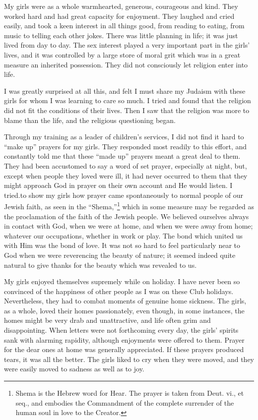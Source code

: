 My girls were as a whole warmhearted, generous,
courageous and kind. They worked hard and had great
capacity for enjoyment. They laughed and cried easily,
and took a keen interest in all things good, from reading
to eating, from music to telling each other jokes.
There was little planning in life; it was just lived from
day to day. The sex interest played a very important
part in the girls’ lives, and it was controlled by a large
store of moral grit which was in a great measure an
inherited possession. They did not consciously let religion
enter into life.

I was greatly surprised at all this, and felt I must
share my Judaism with these girls for whom I was
learning to care so much. I tried and found that the
religion did not fit the conditions of their lives. Then I
saw that the religion was more to blame than the life,
and the religious questioning began.

Through my training as a leader of children’s
services, I did not find it hard to “make up” prayers
for my girls. They responded most readily to this effort,
and constantly told me that these “made up” prayers
meant a great deal to them. They had been accustomed
to say a word of set prayer, especially at night, but,
except when people they loved were ill, it had never
occurred to them that they might approach God in
prayer on their own account and He would listen. I
tried.to show my girls how prayer came spontaneously
to normal people of our Jewish faith, as seen in the
“Shema,”\footnote{Shema is the Hebrew word for Hear.
The prayer is taken from
Deut. vi., et seq., and embodies the Commandment of the complete
surrender of the human soul in love to the Creator.}
which in some measure may be regarded as
the proclamation of the faith of the Jewish people. We
believed ourselves always in contact with God, when we
were at home, and when we were away from home;
whatever our occupations, whether in work or play.
The bond which united us with Him was the bond of
love. It was not so hard to feel particularly near to God
when we were reverencing the beauty of nature; it seemed
indeed quite natural to give thanks for the beauty which
was revealed to us.

My girls enjoyed themselves supremely while on
holiday. I have never been so convinced of the happiness
of other people as I was on these Club holidays.
Nevertheless, they had to combat moments of genuine home
sickness. The girls, as a whole, loved their homes
passionately, even though, in some instances, the homes
might be very drab and unattractive, and life often grim
and disappointing. When letters were not forthcoming
every day, the girls’ spirits sank with alarming rapidity,
although enjoyments were offered to them. Prayer for
the dear ones at home was generally appreciated. If
these prayers produced tears, it was all the better. The
girls liked to cry when they were moved, and they were
easily moved to sadness as well as to joy.

